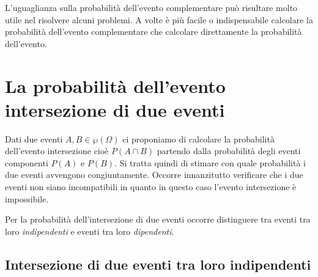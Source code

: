 \osservazione L'uguaglianza sulla probabilità dell'evento complementare può 
risultare molto utile nel risolvere alcuni problemi. A volte è più facile o 
indispensabile calcolare la probabilità dell'evento complementare che calcolare 
direttamente la probabilità dell'evento.


\section{La probabilità dell'evento intersezione di due eventi}
\label{sec:09_intersezione}

Dati due eventi $A,B\in \wp (\Omega )$ ci proponiamo di calcolare la 
probabilità 
dell'evento intersezione cioè $P(A\cap B)$ partendo dalla probabilità degli 
eventi componenti $ P(A) $ e $ P(B) $. Si tratta quindi di stimare con quale 
probabilità i due eventi avvengono congiuntamente. Occorre innanzitutto 
verificare che i due eventi non siano incompatibili in quanto in questo caso 
l'evento intersezione è impossibile.

Per la probabilità dell'intersezione di due eventi occorre distinguere tra 
eventi tra loro \emph{indipendenti} e eventi tra loro \emph{dipendenti}.

\subsection{Intersezione di due eventi tra loro indipendenti}

